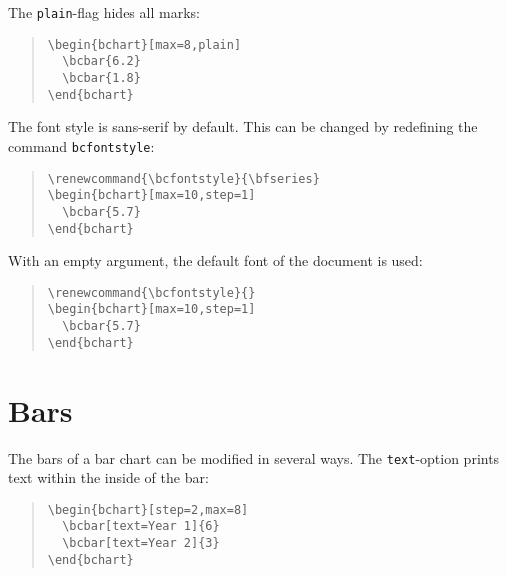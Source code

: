\documentclass{article}
\begin{document}
The \texttt{plain}-flag hides all marks:
\begin{quote}\small
\begin{verbatim}
\begin{bchart}[max=8,plain]
  \bcbar{6.2}
  \bcbar{1.8}
\end{bchart}
\end{verbatim}
\end{quote}
\begin{quote}
\begin{bchart}[max=8,plain]
\end{bchart}
\end{quote}
The font style is sans-serif by default. This can be changed by redefining the command \texttt{bcfontstyle}:
\begin{quote}\small
\begin{verbatim}
\renewcommand{\bcfontstyle}{\bfseries}
\begin{bchart}[max=10,step=1]
  \bcbar{5.7}
\end{bchart}
\end{verbatim}
\end{quote}
\begin{quote}
\renewcommand{\bcfontstyle}{\bfseries}
\begin{bchart}[max=10,step=1]
\end{bchart}
\end{quote}
With an empty argument, the default font of the document is used:
\begin{quote}\small
\begin{verbatim}
\renewcommand{\bcfontstyle}{}
\begin{bchart}[max=10,step=1]
  \bcbar{5.7}
\end{bchart}
\end{verbatim}
\end{quote}
\begin{quote}
\renewcommand{\bcfontstyle}{}
\begin{bchart}[max=10,step=1]
\end{bchart}
\end{quote}


\section{Bars}

The bars of a bar chart can be modified in several ways. The \texttt{text}-option prints text within the inside of the bar:
\begin{quote}\small
\begin{verbatim}
\begin{bchart}[step=2,max=8]
  \bcbar[text=Year 1]{6}
  \bcbar[text=Year 2]{3}
\end{bchart}
\end{verbatim}
\end{quote}
\begin{quote}
\begin{bchart}[step=2,max=8]
\end{bchart}
\end{quote}
\end{document}
